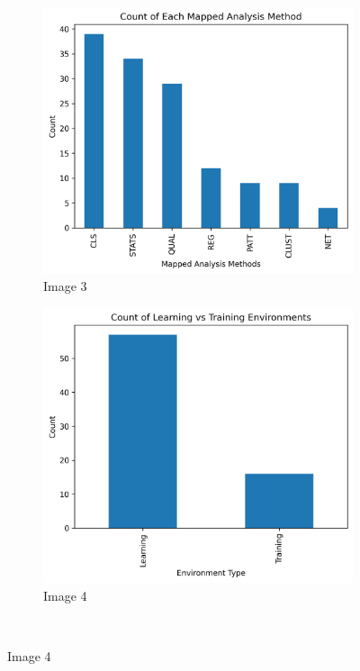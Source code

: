 \documentclass[manuscript,screen,review]{acmart}
\begin{document}
\begin{figure}[h!]
\begin{subfigure}[b]{0.45\textwidth}
        \includegraphics[width=\textwidth]{img/statistical_imgs/analysis_type.png}
        \caption{Image 3}
    \end{subfigure}
    \hfill
    \begin{subfigure}[b]{0.45\textwidth}
        \includegraphics[width=\textwidth]{img/statistical_imgs/learning_vs_training_envs.png}
        \caption{Image 4}
    \end{subfigure}
    \\

\end{figure}
\end{document}
